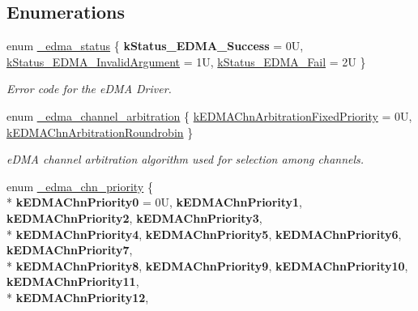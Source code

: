 \subsection*{Enumerations}
\begin{DoxyCompactItemize}
\item 
enum \hyperlink{group__edma__hal_ga4522db4e23f95c72a0a7c93080a96355}{\+\_\+edma\+\_\+status} \{ {\bfseries k\+Status\+\_\+\+E\+D\+M\+A\+\_\+\+Success} = 0U, 
\hyperlink{group__edma__hal_gga4522db4e23f95c72a0a7c93080a96355a194322022386e0fdc50fcb7437c0742b}{k\+Status\+\_\+\+E\+D\+M\+A\+\_\+\+Invalid\+Argument} = 1U, 
\hyperlink{group__edma__hal_gga4522db4e23f95c72a0a7c93080a96355ab6b48173a20862eba0b60d25911253d2}{k\+Status\+\_\+\+E\+D\+M\+A\+\_\+\+Fail} = 2U
 \}\begin{DoxyCompactList}\small\item\em Error code for the e\+D\+MA Driver. \end{DoxyCompactList}
\item 
enum \hyperlink{group__edma__hal_gac176e6a80e3c1339ec8298bd51e9beab}{\+\_\+edma\+\_\+channel\+\_\+arbitration} \{ \hyperlink{group__edma__hal_ggac176e6a80e3c1339ec8298bd51e9beaba6d292e4c74991982da967eef92aeceb5}{k\+E\+D\+M\+A\+Chn\+Arbitration\+Fixed\+Priority} = 0U, 
\hyperlink{group__edma__hal_ggac176e6a80e3c1339ec8298bd51e9beabacb97728581b710ac5b456c4f52e4b9ad}{k\+E\+D\+M\+A\+Chn\+Arbitration\+Roundrobin}
 \}\begin{DoxyCompactList}\small\item\em e\+D\+MA channel arbitration algorithm used for selection among channels. \end{DoxyCompactList}
\item 
enum \hyperlink{group__edma__hal_ga483c1c022e62a1682cbb187ecdf3f5b0}{\+\_\+edma\+\_\+chn\+\_\+priority} \{ \\*
{\bfseries k\+E\+D\+M\+A\+Chn\+Priority0} = 0U, 
{\bfseries k\+E\+D\+M\+A\+Chn\+Priority1}, 
{\bfseries k\+E\+D\+M\+A\+Chn\+Priority2}, 
{\bfseries k\+E\+D\+M\+A\+Chn\+Priority3}, 
\\*
{\bfseries k\+E\+D\+M\+A\+Chn\+Priority4}, 
{\bfseries k\+E\+D\+M\+A\+Chn\+Priority5}, 
{\bfseries k\+E\+D\+M\+A\+Chn\+Priority6}, 
{\bfseries k\+E\+D\+M\+A\+Chn\+Priority7}, 
\\*
{\bfseries k\+E\+D\+M\+A\+Chn\+Priority8}, 
{\bfseries k\+E\+D\+M\+A\+Chn\+Priority9}, 
{\bfseries k\+E\+D\+M\+A\+Chn\+Priority10}, 
{\bfseries k\+E\+D\+M\+A\+Chn\+Priority11}, 
\\*
{\bfseries k\+E\+D\+M\+A\+Chn\+Priority12}, 

\end{DoxyCompactItemize}
